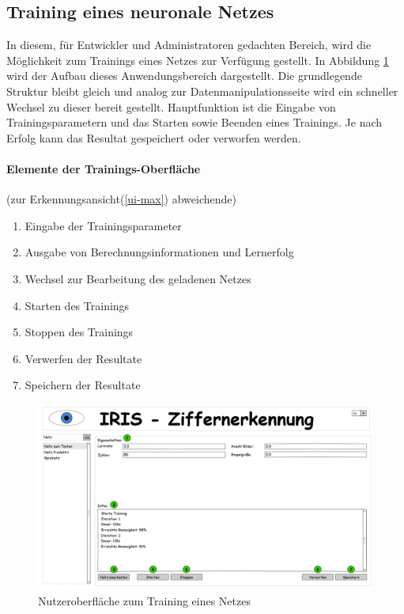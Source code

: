 \subsection{Training eines neuronale Netzes}
In diesem, für Entwickler und Administratoren gedachten Bereich, wird die Möglichkeit zum Trainings eines Netzes zur Verfügung gestellt. In Abbildung \ref{ui-train} wird der Aufbau dieses Anwendungsbereich dargestellt. Die grundlegende Struktur bleibt gleich und analog zur Datenmanipulationsseite wird ein schneller Wechsel zu dieser bereit gestellt. Hauptfunktion ist die Eingabe von Trainingsparametern und das Starten sowie Beenden eines Trainings. Je nach Erfolg kann das Resultat gespeichert oder verworfen werden.

\paragraph{Elemente der Trainings-Oberfläche} (zur Erkennungsansicht(\ref{ui-max}) abweichende)
\begin{enumerate}
\item Eingabe der Trainingsparameter
\item Ausgabe von Berechnungsinformationen und Lernerfolg
\item Wechsel zur Bearbeitung des geladenen Netzes
\item Starten des Trainings
\item Stoppen des Trainings
\item Verwerfen der Resultate
\item Speichern der Resultate
\end{enumerate}

\begin{figure}[H]
	
	\centering
	\includegraphics[width=1\textwidth]{Abbildungen/UI-Mocks/Train-Ui.png}
	\caption{Nutzeroberfläche zum Training eines Netzes}
	\label{ui-train}
\end{figure}


